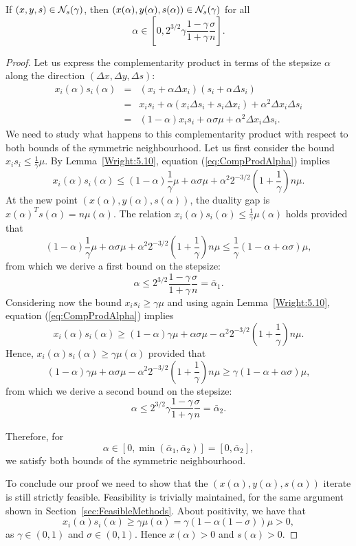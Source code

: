 \begin{theorem} \label{th:SymNeighbourhood}
  If $(x,y,s)\in\mathcal{N}_s(\gamma)$, then 
  $\left(x(\alpha),y(\alpha),s(\alpha)\right)\in\mathcal{N}_s(\gamma)$ for all
  \[
  \alpha\in \left[0,2^{3/2}\gamma\frac{1-\gamma}{1+\gamma}\frac{\sigma}{n} \right].
  \]
\end{theorem}
\begin{proof}
Let us express the complementarity product in terms of the stepsize 
$\alpha$ along the direction $(\Delta x, \Delta y, \Delta s)$:
%
\begin{eqnarray} \label{eq:CompProdAlpha}
x_i(\alpha)s_i(\alpha)&=&(x_i+\alpha\Delta x_i)(s_i+\alpha\Delta s_i)\nonumber\\ 
&=& x_is_i+\alpha(x_i\Delta s_i +s_i\Delta x_i) +\alpha^2\Delta x_i\Delta s_i\\
&=& (1-\alpha)x_is_i + \alpha\sigma\mu + \alpha^2\Delta x_i\Delta s_i.\nonumber
\end{eqnarray}
%
We need to study what happens to this complementarity product 
with respect to both bounds of the symmetric neighbourhood.
%
Let us first consider the bound $x_is_i\le \frac{1}{\gamma}\mu$.
By Lemma~\ref{Wright:5.10}, equation (\ref{eq:CompProdAlpha}) implies
\[
x_i(\alpha)s_i(\alpha) \le (1-\alpha)\frac{1}{\gamma}\mu +\alpha\sigma\mu 
+ \alpha^2 2^{-3/2}\left( 1+ \frac{1}{\gamma} \right)n\mu.
\]
At the new point $(x(\alpha),y(\alpha),s(\alpha))$, the duality gap
is $x(\alpha)^Ts(\alpha) = n\mu(\alpha)$.
The relation $x_i(\alpha)s_i(\alpha)\le \frac{1}{\gamma}\mu(\alpha)$ 
holds provided that
\[
(1-\alpha)\frac{1}{\gamma}\mu +\alpha\sigma\mu + \alpha^2 2^{-3/2}\left( 1+ \frac{1}{\gamma} \right)n\mu 
\le\frac{1}{\gamma}(1-\alpha+\alpha\sigma)\mu,
\]
from which we derive a first bound on the stepsize:
\[
\alpha \le 2^{3/2}\frac{1-\gamma}{1+\gamma}\frac{\sigma}{n} = \bar\alpha_1.
\]
%
Considering now the bound $x_is_i\ge \gamma\mu$ and using again
Lemma~\ref{Wright:5.10}, equation (\ref{eq:CompProdAlpha}) implies
\[
x_i(\alpha)s_i(\alpha) \ge (1-\alpha)\gamma\mu + \alpha\sigma\mu 
- \alpha^2 2^{-3/2}\left( 1+ \frac{1}{\gamma} \right)n\mu.
\]
Hence, $x_i(\alpha)s_i(\alpha)\ge \gamma\mu(\alpha)$ provided that
\[
(1-\alpha)\gamma\mu + \alpha\sigma\mu- \alpha^2 2^{-3/2}\left( 1+ \frac{1}{\gamma} \right)n\mu 
\ge\gamma(1-\alpha+\alpha\sigma)\mu,
\]
from which we derive a second bound on the stepsize:
\[
\alpha\le 2^{3/2}\gamma\frac{1-\gamma}{1+\gamma}\frac{\sigma}{n} =\bar\alpha_2.
\]

Therefore, for
\[
\alpha \in [0,\min(\bar\alpha_1,\bar\alpha_2)] = [0, \bar\alpha_2],
\]
we satisfy both bounds of the symmetric neighbourhood.

To conclude our proof we need to show that the 
$(x(\alpha),y(\alpha),s(\alpha))$ iterate is still strictly feasible.
Feasibility is trivially maintained, for the same argument shown 
in Section~\ref{sec:FeasibleMethods}.
About positivity, we have that
\[
  x_i(\alpha)s_i(\alpha) \ge \gamma \mu(\alpha) 
                         = \gamma(1 - \alpha(1-\sigma))\mu > 0,
\]
as $\gamma\in (0,1)$ and $\sigma \in (0,1)$. 
Hence $x(\alpha)>0$ and $s(\alpha)>0$.
\end{proof}

